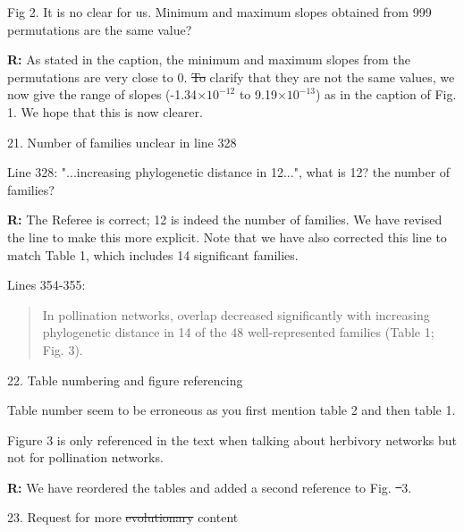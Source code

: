 \documentclass[12pt]{letter}
\newenvironment{refquote}{\bigskip \begin{it}}{\end{it}\smallskip}
\providecommand{\DIFadd}[1]{{\protect\color{blue}\uwave{#1}}} %
\providecommand{\DIFdel}[1]{{\protect\color{red}\sout{#1}}}                      %
\providecommand{\DIFaddbegin}{} %
\providecommand{\DIFaddend}{} %
\providecommand{\DIFdelbegin}{} %
\providecommand{\DIFdelend}{} %
\newcommand{\DIFscaledelfig}{0.5}
\newlength{\DIFdelgraphicswidth} %
\newlength{\DIFdelgraphicsheight} %
\newcommand{\DIFaddincludegraphics}[2][]{{\color{blue}\fbox{\DIFOincludegraphics[#1]{#2}}}} %
\newcommand{\DIFdelincludegraphics}[2][]{%
\sbox{\DIFdelgraphicsbox}{\DIFOincludegraphics[#1]{#2}}%
\settoboxwidth{\DIFdelgraphicswidth}{\DIFdelgraphicsbox} %
\settoboxtotalheight{\DIFdelgraphicsheight}{\DIFdelgraphicsbox} %
\scalebox{\DIFscaledelfig}{%
\parbox[b]{\DIFdelgraphicswidth}{\usebox{\DIFdelgraphicsbox}\\[-\baselineskip] \rule{\DIFdelgraphicswidth}{0em}}\llap{\resizebox{\DIFdelgraphicswidth}{\DIFdelgraphicsheight}{%
\setlength{\unitlength}{\DIFdelgraphicswidth}%
\begin{picture}(1,1)%
\thicklines\linethickness{2pt} %
{\color[rgb]{1,0,0}\put(0,0){\framebox(1,1){}}}%
{\color[rgb]{1,0,0}\put(0,0){\line( 1,1){1}}}%
{\color[rgb]{1,0,0}\put(0,1){\line(1,-1){1}}}%
\end{picture}%
}\hspace*{3pt}}} %
} %
\DeclareRobustCommand{\DIFaddbegin}{\DIFOaddbegin \let\includegraphics\DIFaddincludegraphics} %
\DeclareRobustCommand{\DIFaddend}{\DIFOaddend \let\includegraphics\DIFOincludegraphics} %
\DeclareRobustCommand{\DIFdelbegin}{\DIFOdelbegin \let\includegraphics\DIFdelincludegraphics} %
\DeclareRobustCommand{\DIFdelend}{\DIFOaddend \let\includegraphics\DIFOincludegraphics} %
\begin{document}
		\begin{refquote}
			Fig 2. It is no clear for us. Minimum and maximum slopes obtained from 999 permutations are the same value?
		\end{refquote}


		\textbf{R:} As stated in the caption, the minimum and maximum slopes from the permutations are very close to 0. \DIFdelbegin \DIFdel{To }\DIFdelend \DIFaddbegin \DIFadd{The }\DIFaddend clarify that they are not the same values, we now give the range of slopes (-1.34$\times10^{-12}$ to 9.19$\times10^{-13}$) as in the caption of Fig. 1. We hope that this is now clearer.


	21. Number of families unclear in line 328

		\begin{refquote}
			Line  328: "...increasing phylogenetic distance in 12...", what is 12? the number of families?
		\end{refquote}

		\textbf{R:} The Referee is correct; 12 is indeed the number of families. We have revised the line to make this more explicit. Note that we have also corrected this line to match Table 1, which includes 14 significant families.


		Lines 354-355: 


		\begin{quotation}

		In pollination networks, overlap decreased significantly with increasing phylogenetic distance in 14 of the 48 well-represented families (Table 1; Fig. 3).

		\end{quotation}


	22. Table numbering and figure referencing

		\begin{refquote}
			Table number seem to be erroneous as you first mention table 2 and then table 1.

			\smallskip

			Figure 3 is only referenced in the text when talking about herbivory networks but not for pollination networks.
		\end{refquote}


		\textbf{R:} We have reordered the tables and added a second reference to Fig. \DIFdelbegin \DIFdel{~}\DIFdelend 3.


	23. Request for more \DIFdelbegin \DIFdel{evolutionary }\DIFdelend \DIFaddbegin \DIFadd{evolution }\DIFaddend content
\end{document}
